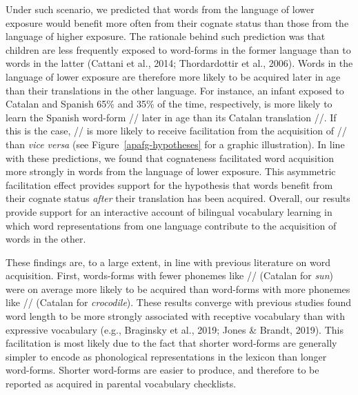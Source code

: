 \documentclass[
  man,
  floatsintext,
  colorlinks=true,linkcolor=blue,citecolor=blue,urlcolor=blue,biblatex]{apa7}
\begin{document}
Under such scenario, we predicted that words from the language of lower
exposure would benefit more often from their cognate status than those
from the language of higher exposure. The rationale behind such
prediction was that children are less frequently exposed to word-forms
in the former language than to words in the latter (Cattani et al.,
2014; Thordardottir et al., 2006). Words in the language of lower
exposure are therefore more likely to be acquired later in age than
their translations in the other language. For instance, an infant
exposed to Catalan and Spanish 65\% and 35\% of the time, respectively,
is more likely to learn the Spanish word-form // later
in age than its Catalan translation //. If this is the
case, // is more likely to receive facilitation from the
acquisition of // than \emph{vice versa} (see
Figure~\ref{apafg-hypotheses} for a graphic illustration). In line with
these predictions, we found that cognateness facilitated word
acquisition more strongly in words from the language of lower exposure.
This asymmetric facilitation effect provides support for the hypothesis
that words benefit from their cognate status \emph{after} their
translation has been acquired. Overall, our results provide support for
an interactive account of bilingual vocabulary learning in which word
representations from one language contribute to the acquisition of words
in the other.

These findings are, to a large extent, in line with previous literature
on word acquisition. First, words-forms with fewer phonemes like
// (Catalan for \emph{sun}) were on average more
likely to be acquired than word-forms with more phonemes like
// (Catalan for \emph{crocodile}). These
results converge with previous studies found word length to be more
strongly associated with receptive vocabulary than with expressive
vocabulary (e.g., Braginsky et al., 2019; Jones \& Brandt, 2019). This
facilitation is most likely due to the fact that shorter word-forms are
generally simpler to encode as phonological representations in the
lexicon than longer word-forms. Shorter word-forms are easier to
produce, and therefore to be reported as acquired in parental vocabulary
checklists.
\end{document}

